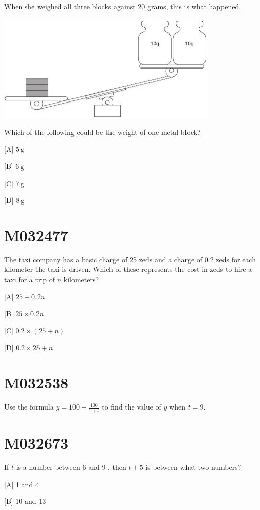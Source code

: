 \documentclass[12pt]{article}
\begin{document}
When she weighed all three blocks against 20 grams, this is what happened.

\includegraphics[max width=0.8\textwidth]{2024_02_20_828ebc9d68bcc1fbb223g-25(1)}

Which of the following could be the weight of one metal block?

[A] $5 \mathrm{~g}$

[B] $6 \mathrm{~g}$

[C] $7 \mathrm{~g}$

[D] $8 \mathrm{~g}$

\newpage
\section*{M032477}

The taxi company has a basic charge of 25 zeds and a charge of 0.2 zeds for each kilometer the taxi is driven. Which of these represents the cost in zeds to hire a taxi for a trip of $n$ kilometers?

[A] $25+0.2 n$

[B] $25 \times 0.2 n$

[C] $0.2 \times(25+n)$

[D] $0.2 \times 25+n$

\newpage
\section*{M032538}

Use the formula $y=100-\frac{100}{1+t}$ to find the value of $y$ when $t=9$.

\newpage
\section*{M032673}

If $t$ is a number between 6 and 9 , then $t+5$ is between what two numbers?

[A] 1 and 4

[B] 10 and 13
\end{document}
